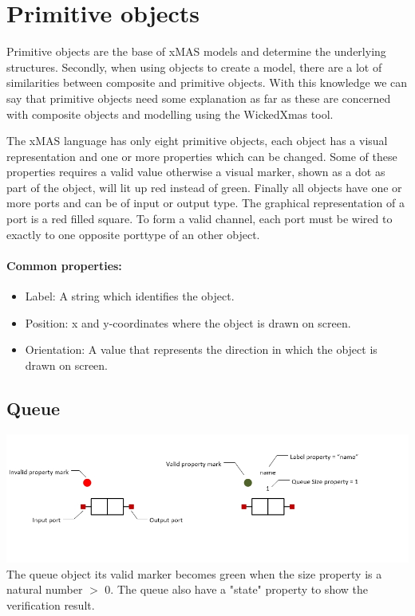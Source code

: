 \documentclass[a4paper,11pt,final]{article}
\begin{document}
\newpage
\section{Primitive objects}
Primitive objects are the base of xMAS models and determine the underlying structures.
Secondly, when using objects to create a model, there are a lot of similarities between
composite and primitive objects. With this knowledge we can say that
primitive objects need some explanation as far as these are concerned with
composite objects and modelling using the WickedXmas tool.

The xMAS language has only eight primitive objects,
each object has a visual representation and one or more properties which can be
changed. Some of these properties requires a valid value otherwise a
visual marker, shown as a dot as part of the object, will lit up red instead of
green. Finally all objects have one or more ports and can be of input or output
type. The graphical representation of a port is a red filled square. 
To form a valid channel, each port must be wired to exactly to one
opposite porttype of an other object.

\paragraph{Common properties:}
\begin{itemize}
\item Label: A string which identifies the object.
\item Position: x and y-coordinates where the object is drawn on screen.
\item Orientation: A value that represents the direction in which the object is drawn on screen.
\end{itemize}

\subsection{Queue}
\includegraphics[width=1.0\textwidth]{queue}
The queue object its valid marker becomes green when the size property is a natural number $>$ 0. 
The queue also have a "state" property to show the verification result. 
\end{document}
